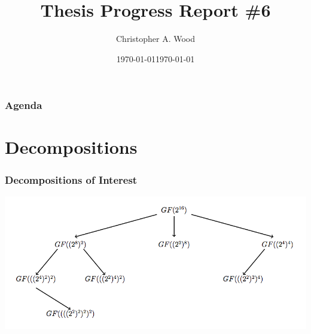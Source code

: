\documentclass[handout]{beamer}
\title[Thesis Progress Report \#6]{Thesis Progress Report \#6}
\institute[RIT]{}
\date{\today}
\author{Christopher A. Wood}
\date{\today}
\begin{document}

\begin{frame}
	\titlepage
\end{frame}

\begin{frame}
	\frametitle{Agenda}
	\tableofcontents
\end{frame}

\section{Decompositions}
\begin{frame}
	\frametitle{Decompositions of Interest}
	\begin{center}
	\includegraphics[scale=0.35]{towers.png}
	\end{center}
\end{frame}
\end{document}
